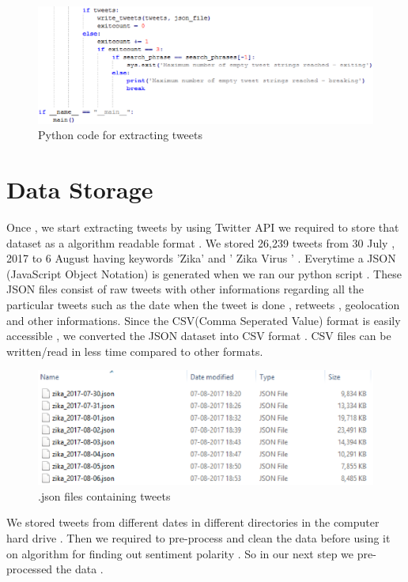 \begin{figure}[h]
\centerline{\includegraphics[width=5.7in]{CODE-4}}
\caption{Python code for extracting tweets}
\end{figure}

\section{Data Storage}
      Once , we start extracting tweets by using Twitter API we required to store that dataset  as a algorithm readable format . We stored 26,239 tweets from 30 July , 2017 to 6 August having keywords 'Zika' and  ' Zika Virus '  . Everytime a JSON (JavaScript Object Notation)  is generated when we ran our python script . These JSON files consist of raw tweets with other informations regarding all the particular tweets such as the date when the tweet is done , retweets  , geolocation and other informations. Since the CSV(Comma Seperated Value) format is easily  accessible , we converted the JSON dataset into CSV format . CSV files can be written/read in less time compared to other formats.
 \begin{figure}[h]
\centerline{\includegraphics[width=5.7in]{tw1}}
\caption{.json files containing tweets}
\end{figure}


We stored tweets from different dates in different directories in the computer hard drive . Then we required to pre-process  and clean the data before using it on algorithm for finding out sentiment polarity . So in our next step we pre-processed  the data .
